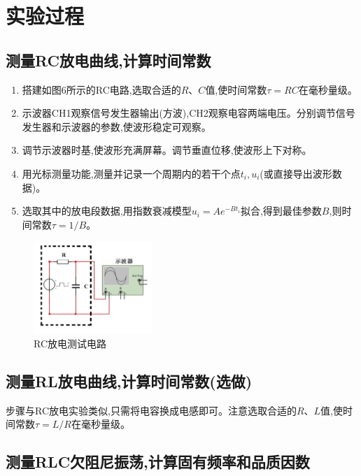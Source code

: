 \documentclass[UTF8]{ctexart}
\begin{document}
\section{实验过程}

\subsection{测量RC放电曲线,计算时间常数}

\begin{enumerate}
\item 搭建如图6所示的RC电路,选取合适的$R$、$C$值,使时间常数$\tau=RC$在毫秒量级。
\item 示波器CH1观察信号发生器输出(方波),CH2观察电容两端电压。分别调节信号发生器和示波器的参数,使波形稳定可观察。
\item 调节示波器时基,使波形充满屏幕。调节垂直位移,使波形上下对称。
\item 用光标测量功能,测量并记录一个周期内的若干个点${t_i,u_i}$(或直接导出波形数据)。
\item 选取其中的放电段数据,用指数衰减模型$u_i=Ae^{-Bt_i}$拟合,得到最佳参数$B$,则时间常数$\tau=1/B$。
\end{enumerate}

\begin{figure}[htbp]
\centering
\includegraphics[width=0.4\textwidth]{RC_test.png}
\caption{RC放电测试电路}
\end{figure}

\subsection{测量RL放电曲线,计算时间常数(选做)}

步骤与RC放电实验类似,只需将电容换成电感即可。注意选取合适的$R$、$L$值,使时间常数$\tau=L/R$在毫秒量级。

\subsection{测量RLC欠阻尼振荡,计算固有频率和品质因数}
\end{document}
